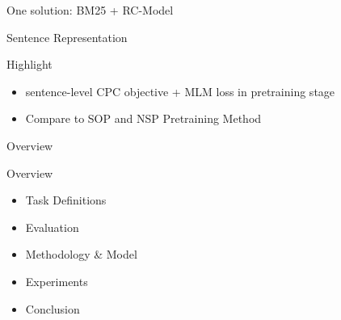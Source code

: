 \documentclass[10pt]{beamer}
\begin{document}
\begin{frame}{One solution: BM25 + RC-Model}
    \begin{figure}
        
    \end{figure}
\end{frame}

\begin{frame}[t]{Sentence Representation}

    \begin{figure}
        \begin{center}
        \end{center}
    \end{figure}
    \begin{center}
    \end{center}
\end{frame}

\begin{frame}{Highlight}

    \begin{itemize}
        \item sentence-level CPC objective + MLM loss in pretraining stage
        \item Compare to SOP and NSP Pretraining Method
    \end{itemize}

\end{frame}

\begin{frame}{Overview}

Overview
\begin{itemize}
    \item Task Definitions
    \item Evaluation
    \item Methodology \& Model
    \item Experiments
    \item Conclusion
\end{itemize}

\end{frame}
\end{document}
